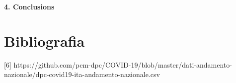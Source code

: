 \documentclass[a4paper]{article}
\begin{document}
\bigskip


\bigskip


\bigskip


\bigskip


\bigskip


\bigskip


\bigskip


\bigskip


\bigskip


\bigskip


\bigskip

\textbf{4. Conclusions}


\bigskip


\bigskip

\section{Bibliografia}
\hypertarget{Toc66707031}{}
\bigskip

[6] https://github.com/pcm-dpc/COVID-19/blob/master/dati-andamento-nazionale/dpc-covid19-ita-andamento-nazionale.csv
\end{document}

